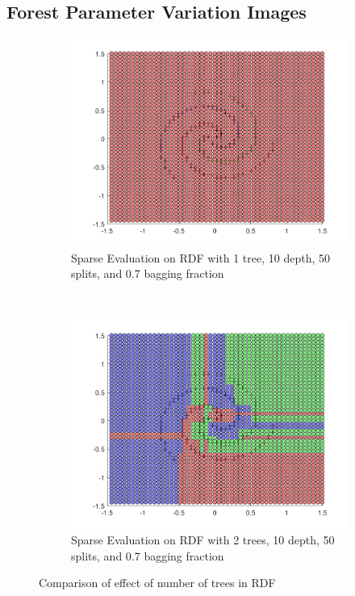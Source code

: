 \documentclass[a4paper, 10pt, conference]{ieeeconf}
\begin{document}
\subsection*{Forest Parameter Variation Images}
\begin{figure}[!ht]
  \captionsetup[subfigure]{position=b}
  \centering
    \begin{subfigure}{0.45\linewidth}
      \includegraphics[width=\textwidth]{img/tree_params/tree_sparse_1_10_50_7}
      \caption{Sparse Evaluation on RDF with 1 tree, 10 depth, 50 splits, and 0.7 bagging fraction}
      \label{fig:sparse_1_10_50_7}
    \end{subfigure}
    ~
    \begin{subfigure}{0.45\linewidth}
      \includegraphics[width=\textwidth]{img/tree_params/tree_sparse_2_10_50_7}
      \caption{Sparse Evaluation on RDF with 2 trees, 10 depth, 50 splits, and 0.7 bagging fraction}
      \label{fig:sparse_2_10_50_7}
    \end{subfigure}

  \caption{Comparison of effect of number of trees in RDF}
  \label{fig:compare_no_trees}
\end{figure}
\end{document}
